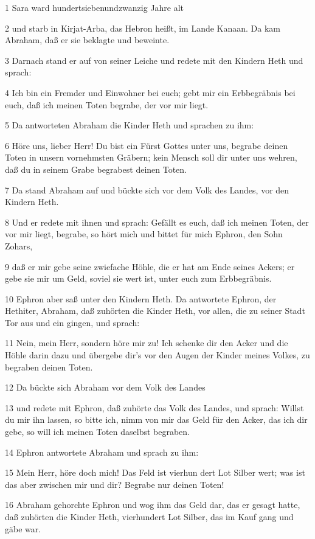 \par 1 Sara ward hundertsiebenundzwanzig Jahre alt
\par 2 und starb in Kirjat-Arba, das Hebron heißt, im Lande Kanaan. Da kam Abraham, daß er sie beklagte und beweinte.
\par 3 Darnach stand er auf von seiner Leiche und redete mit den Kindern Heth und sprach:
\par 4 Ich bin ein Fremder und Einwohner bei euch; gebt mir ein Erbbegräbnis bei euch, daß ich meinen Toten begrabe, der vor mir liegt.
\par 5 Da antworteten Abraham die Kinder Heth und sprachen zu ihm:
\par 6 Höre uns, lieber Herr! Du bist ein Fürst Gottes unter uns, begrabe deinen Toten in unsern vornehmsten Gräbern; kein Mensch soll dir unter uns wehren, daß du in seinem Grabe begrabest deinen Toten.
\par 7 Da stand Abraham auf und bückte sich vor dem Volk des Landes, vor den Kindern Heth.
\par 8 Und er redete mit ihnen und sprach: Gefällt es euch, daß ich meinen Toten, der vor mir liegt, begrabe, so hört mich und bittet für mich Ephron, den Sohn Zohars,
\par 9 daß er mir gebe seine zwiefache Höhle, die er hat am Ende seines Ackers; er gebe sie mir um Geld, soviel sie wert ist, unter euch zum Erbbegräbnis.
\par 10 Ephron aber saß unter den Kindern Heth. Da antwortete Ephron, der Hethiter, Abraham, daß zuhörten die Kinder Heth, vor allen, die zu seiner Stadt Tor aus und ein gingen, und sprach:
\par 11 Nein, mein Herr, sondern höre mir zu! Ich schenke dir den Acker und die Höhle darin dazu und übergebe dir's vor den Augen der Kinder meines Volkes, zu begraben deinen Toten.
\par 12 Da bückte sich Abraham vor dem Volk des Landes
\par 13 und redete mit Ephron, daß zuhörte das Volk des Landes, und sprach: Willst du mir ihn lassen, so bitte ich, nimm von mir das Geld für den Acker, das ich dir gebe, so will ich meinen Toten daselbst begraben.
\par 14 Ephron antwortete Abraham und sprach zu ihm:
\par 15 Mein Herr, höre doch mich! Das Feld ist vierhun dert Lot Silber wert; was ist das aber zwischen mir und dir? Begrabe nur deinen Toten!
\par 16 Abraham gehorchte Ephron und wog ihm das Geld dar, das er gesagt hatte, daß zuhörten die Kinder Heth, vierhundert Lot Silber, das im Kauf gang und gäbe war.
